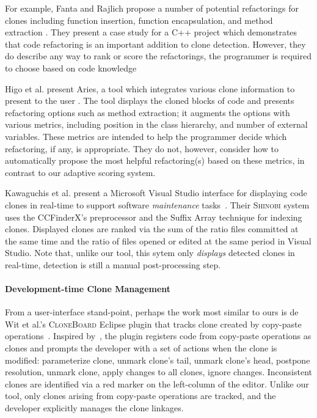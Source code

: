 \documentclass[preprint,10pt]{sigplanconf}
\newcommand{\todo}[1]{{\bfseries [[#1]]}}
\begin{document}
For example, Fanta and Rajlich propose a number of
potential refactorings for clones including function insertion, function encapsulation,
and method extraction \cite{Fanta1999}.  They 
present a case study for a C++ project which demonstrates that code refactoring is an important 
addition to clone detection. However, they do describe any way to rank or score the refactorings,
the programmer is required to choose based on code knowledge

Higo et al. present Aries, a tool which integrates various clone
information to present to the user \cite{Higo2008}.  The tool displays the
cloned blocks of code and presents refactoring options such as method
extraction; it augments the options with various metrics, including position in
the class hierarchy, and number of external variables. These metrics
are intended to help the programmer decide which refactoring, if any,
is appropriate. They do not, however, consider how to automatically 
propose the most helpful refactoring(s) based on these metrics, in contrast 
to our adaptive scoring system.

Kawaguchis et al. present a  
Microsoft Visual Studio interface for
displaying code clones in real-time to support software
\emph{maintenance} tasks~\cite{Kawaguchi2009,Yamashina2008}. Their
\textsc{Shinobi} system uses the CCFinderX's preprocessor and the Suffix Array
technique for indexing clones. Displayed clones are ranked via the sum
of the ratio files committed at the same time and the ratio of files
opened or edited at the same period in Visual Studio. Note that, unlike our tool,
 this sytem only \emph{displays} detected clones in real-time, detection is still
 a manual post-processing step.

\paragraph{Development-time Clone Management}

From a user-interface stand-point, perhaps the work most similar to
ours is de Wit et al.'s \textsc{CloneBoard} Eclipse plugin that tracks
clone created by copy-paste operations~\cite{deWit2009}. Inspired
by~\cite{Mann2006}, the plugin registers code from copy-paste
operations as clones and prompts the developer with a set of actions
when the clone is modified: parameterize clone, unmark clone's tail,
unmark clone's head, postpone resolution, unmark clone, apply changes
to all clones, ignore changes. Inconsistent clones are identified via
a red marker on the left-column of the editor. Unlike our tool, only
clones arising from copy-paste operations are tracked, and the
developer explicitly manages the clone linkages.
\end{document}
